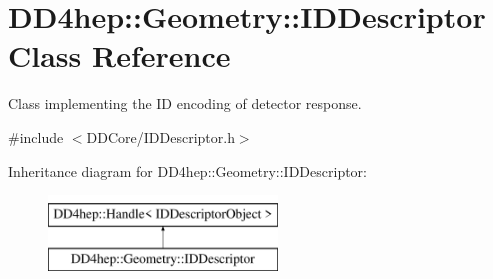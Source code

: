 \hypertarget{class_d_d4hep_1_1_geometry_1_1_i_d_descriptor}{}\section{D\+D4hep\+:\+:Geometry\+:\+:I\+D\+Descriptor Class Reference}
\label{class_d_d4hep_1_1_geometry_1_1_i_d_descriptor}


Class implementing the ID encoding of detector response.  




{\ttfamily \#include $<$D\+D\+Core/\+I\+D\+Descriptor.\+h$>$}

Inheritance diagram for D\+D4hep\+:\+:Geometry\+:\+:I\+D\+Descriptor\+:\begin{figure}[H]
\begin{center}
\leavevmode
\includegraphics[height=2.000000cm]{class_d_d4hep_1_1_geometry_1_1_i_d_descriptor}
\end{center}
\end{figure}
